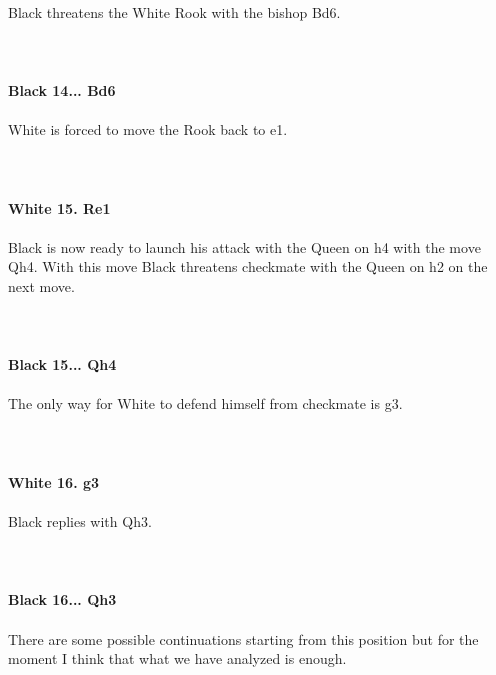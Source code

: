 \documentclass{article}
\begin{document}
\\
Black threatens the White Rook with the bishop Bd6.\\
\\

\\
\\
\textbf{Black 14... Bd6}\\
\\
White is forced to move the Rook back to e1.\\
\\

\\
\\
\textbf{White 15. Re1}\\
\\
Black is now ready to launch his attack with the Queen on h4 with the move Qh4. With this move Black threatens checkmate with the Queen on h2 on the next move.\\
\\

\\
\\
\textbf{Black 15... Qh4}\\
\\
The only way for White to defend himself from checkmate is g3.\\
\\

\\
\\
\textbf{White 16. g3}\\
\\
Black replies with Qh3.\\
\\

\\
\\
\textbf{Black 16... Qh3}\\
\\
There are some possible continuations starting from this position but for the moment I think that what we have analyzed is enough.
\end{document}
